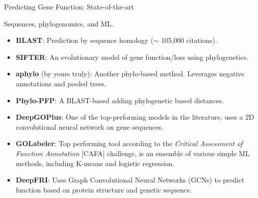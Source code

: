 \documentclass[10pt,aspectratio=169]{beamer}
\newcounter{frame}[frame]
\begin{document}
\begin{frame}{Predicting Gene Function: State-of-the-art}
	
	Sequences, phylogenomics, and ML.
	
	\begin{itemize}[<+->]
		\item \textbf{BLAST}\autocite{altschulBasicLocalAlignment1990}: Prediction by sequence homology ($\sim$ 105,000 citations).
		\item \textbf{SIFTER}\autocite{Engelhardt2005, Engelhardt2011}: An evolutionary model of gene function/loss using phylogenetics.
		\item \textbf{aphylo}\autocite{VegaYon2021} (by yours truly): Another phylo-based method. Leverages negative annotations and pooled trees.
		\item \textbf{Phylo-PFP}\autocite{Jain2019}: A BLAST-based adding phylogenetic based distances.
		\item \textbf{DeepGOPlus}\autocite{kulmanovDeepGOPlusImprovedProtein2019}: One of the top-performing models in the literature, uses a 2D convolutional neural network on gene sequences.
		\item \textbf{GOLabeler}\autocite{youGOLabelerImprovingSequencebased2018}: Top performing tool according to the \textit{Critical Assessment of Function Annotation} [CAFA] challenge\autocite{Zhou2019cafa}, is an ensemble of various simple ML methods, including K-means and logistic regression.
            \item \textbf{DeepFRI}\autocite{gligorijevicStructurebasedProteinFunction2021}: Uses Graph Convolutional Neural Networks (GCNs) to predict function based on protein structure and genetic sequence.
	\end{itemize}

	\vfil {}	
\end{frame}
\end{document}
